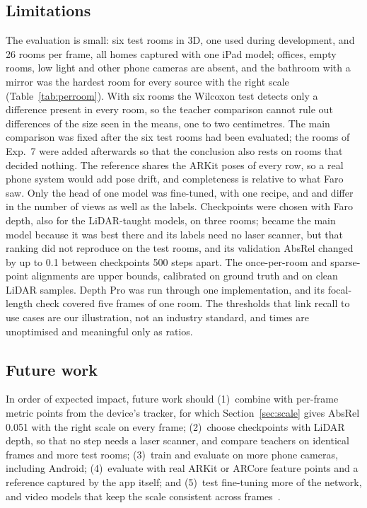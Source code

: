 \subsection{Limitations}\label{sec:limitations}
The evaluation is small: six test rooms in 3D, one used during development, and 26 rooms per frame, all homes captured
with one iPad model; offices, empty rooms, low light and other phone cameras are absent, and the bathroom with a mirror
was the hardest room for every source with the right scale (Table~\ref{tab:perroom}). With six rooms the Wilcoxon test
detects only a difference present in every room, so the teacher comparison cannot rule out differences of the size seen
in the means, one to two centimetres. The main comparison was fixed after the six test rooms had been evaluated; the
\rsVN{} rooms of Exp.~7 were added afterwards so that the conclusion also rests on rooms that decided nothing. The
reference shares the ARKit poses of every row, so a real phone system would add pose drift, and completeness is relative
to what Faro saw. Only the head of one model was fine-tuned, with one recipe, and \ftfaro{} and \ftlidar{} differ in
the number of views as well as the labels. Checkpoints were chosen with Faro depth, also for the LiDAR-taught models, on
three rooms; \ftmain{} became the main model because it was best there and its labels need no laser scanner, but that
ranking did not reproduce on the test rooms, and its validation AbsRel changed by up to 0.1 between checkpoints 500
steps apart. The once-per-room and sparse-point
alignments are upper bounds, calibrated on ground truth and on clean LiDAR samples. Depth Pro was run through one
implementation, and its focal-length check covered five frames of one room. The thresholds that link recall to use
cases are our illustration, not an industry standard, and times are unoptimised and meaningful only as ratios.

\subsection{Future work}\label{sec:future}
In order of expected impact, future work should (1)~combine \ftmain{} with per-frame metric points from the device's
tracker, for which Section~\ref{sec:scale} gives AbsRel 0.051 with the right scale on every frame; (2)~choose
checkpoints with LiDAR depth, so that no step needs a laser scanner, and compare teachers on identical frames and more
test rooms; (3)~train and evaluate on more phone cameras, including Android; (4)~evaluate with real ARKit or ARCore
feature points and a reference captured by the app itself; and (5)~test fine-tuning more of the network, and video
models that keep the scale consistent across frames~\cite{videoda}.

